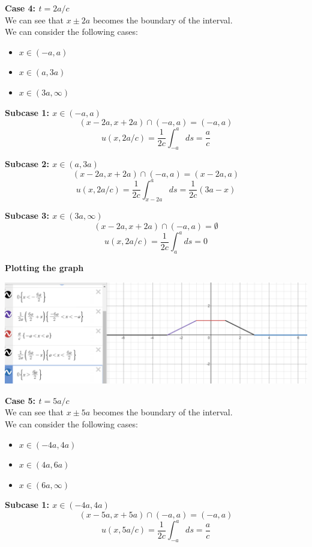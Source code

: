 \documentclass[answers,12pt,addpoints]{exam}
\begin{document}
\begin{questions}
\textbf{Case 4: $t = 2a/c$}\\
We can see that $x \pm 2a$ becomes the boundary of the interval. \\
We can consider the following cases:
\begin{itemize}
    \item $ x \in (-a, a)$
    \item $ x \in (a, 3a)$
    \item $ x \in (3a, \infty)$
\end{itemize}
\textbf{Subcase 1: $x \in (-a, a)$}\\
$$(x-2a, x+2a) \cap (-a,a) = (-a,a)$$
$$u(x,2a/c) = \frac{1}{2c} \int_{-a}^{a} ds = \frac{a}{c}$$

\textbf{Subcase 2: $x \in (a, 3a)$}\\
$$(x-2a, x+2a) \cap (-a,a) = (x-2a, a)$$
$$u(x,2a/c) = \frac{1}{2c} \int_{x-2a}^{a} ds = \frac{1}{2c}({3a}-x)$$

\textbf{Subcase 3: $x \in (3a, \infty)$}\\
$$(x-2a, x+2a) \cap (-a,a) = \emptyset$$
$$u(x,2a/c) = \frac{1}{2c} \int_{a}^{a} ds = 0$$

\textbf{Plotting the graph}\\

\begin{center}
    \includegraphics[scale = 0.5]{HW3IMG/14.png}
\end{center}


\textbf{Case 5: $t = 5a/c$}\\
We can see that $x \pm 5a$ becomes the boundary of the interval. \\
We can consider the following cases:
\begin{itemize}
    \item $ x \in (-4a, 4a)$
    \item $ x \in (4a, 6a)$
    \item $ x \in (6a, \infty)$
\end{itemize}
\textbf{Subcase 1: $x \in (-4a, 4a)$}\\
$$(x-5a, x+5a) \cap (-a,a) = (-a,a)$$
$$u(x,5a/c) = \frac{1}{2c} \int_{-a}^{a} ds = \frac{a}{c}$$


\end{questions}
\end{document}
